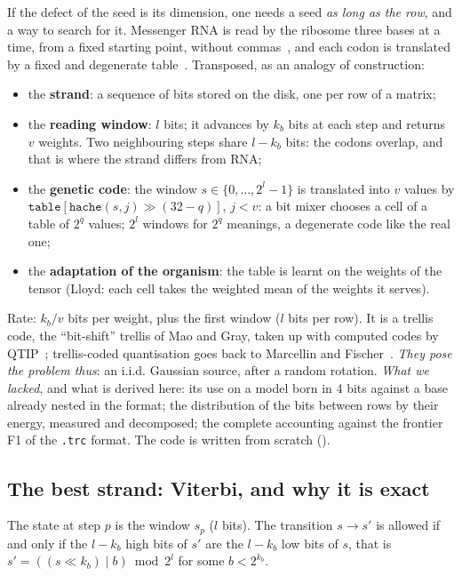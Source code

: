 If the defect of the seed is its dimension, one needs a seed \emph{as long as the row}, and a way to search for it. Messenger RNA is read by the ribosome three bases at a time, from a fixed starting point, without commas~\cite{genome-crick1961}, and each codon is translated by a fixed and degenerate table~\cite{genome-crick1968}. Transposed, as an analogy of construction:
\begin{itemize}
\item the \textbf{strand}: a sequence of bits stored on the disk, one per row of a matrix;
\item the \textbf{reading window}: $l$ bits; it advances by $k_b$ bits at each step and returns $v$ weights. Two neighbouring steps share $l - k_b$ bits: the codons overlap, and that is where the strand differs from RNA;
\item the \textbf{genetic code}: the window $s \in \{0, \ldots, 2^l - 1\}$ is translated into $v$ values by $\texttt{table}[\texttt{hache}(s, j) \gg (32 - q)]$, $j < v$: a bit mixer chooses a cell of a table of $2^q$ values; $2^l$ windows for $2^q$ meanings, a degenerate code like the real one;
\item the \textbf{adaptation of the organism}: the table is learnt on the weights of the tensor (Lloyd: each cell takes the weighted mean of the weights it serves).
\end{itemize}
Rate: $k_b / v$ bits per weight, plus the first window ($l$ bits per row). It is a trellis code, the ``bit-shift'' trellis of Mao and Gray, taken up with computed codes by QTIP~\cite{genome-mao2010,genome-qtip}; trellis-coded quantisation goes back to Marcellin and Fischer~\cite{marcellin1990,genome-fischer1991}. \emph{They pose the problem thus}: an i.i.d. Gaussian source, after a random rotation. \emph{What we lacked}, and what is derived here: its use on a model born in 4 bits against a base already nested in the format; the distribution of the bits between rows by their energy, measured and decomposed; the complete accounting against the frontier F1 of the \texttt{.trc} format. The code is written from scratch ().

\subsection{The best strand: Viterbi, and why it is exact}

The state at step $p$ is the window $s_p$ ($l$ bits). The transition $s \to s'$ is allowed if and only if the $l - k_b$ high bits of $s'$ are the $l - k_b$ low bits of $s$, that is $s' = ((s \ll k_b) \mid b) \bmod 2^l$ for some $b < 2^{k_b}$.

